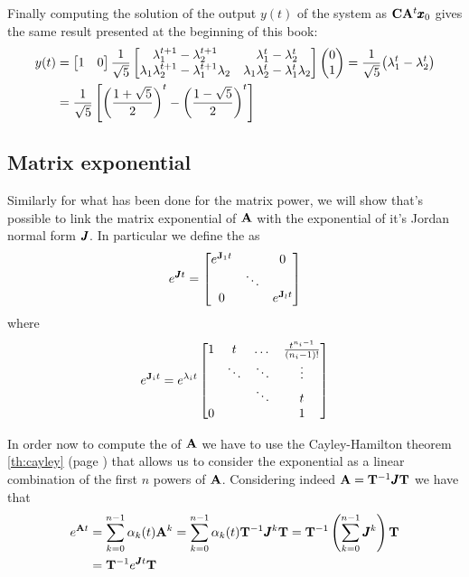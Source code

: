 	Finally computing the solution of the output $y(t)$ of the system as $\mathbf{C} \mathbf{A}^t \pmb{x}_0$ gives the same result presented at the beginning of this book:
	\begin{align*}
		y(t) & = \begin{bmatrix} 1 & 0 \end{bmatrix} \frac 1{\sqrt 5} \begin{bmatrix}  \lambda_1^{t+1} -\lambda_2^{t+1} & \lambda_1^t - \lambda_2^t \\ \lambda_1 \lambda_2^{t+1} - \lambda_1^{t+1} \lambda_2 & \lambda_1\lambda_2^t - \lambda_1^t \lambda_2   \end{bmatrix} \begin{pmatrix} 0 \\ 1 \end{pmatrix} = \frac 1 {\sqrt 5}\big(\lambda_1^t - \lambda_2^t\big) \\ & = \frac 1 {\sqrt 5} \left[ \left(\frac{1+\sqrt 5}{2}\right)^t - \left(\frac{1-\sqrt 5}{2}\right)^t \right]
	\end{align*}
	
\subsection{Matrix exponential}
	Similarly for what has been done for the matrix power, we will show that's possible to link the matrix exponential of $\mathbf{A}$ with the exponential of it's Jordan normal form $\pmb{J}$. In particular we define the  as
	\begin{equation}
		e^{\pmb{J} t} = \begin{bmatrix} e^{\mathbf{J}_1t} & & 0 \\ & \ddots \\ 0 & & e^{\mathbf{J}_l t} \end{bmatrix}
	\end{equation}
 	where
 	\begin{equation}
 		e^{\mathbf{J}_i t} = e^{\lambda_i t} \begin{bmatrix} 1 & t & \dots & \frac{t^{n_i-1}}{(n_i-1)!} \\ & \ddots & \ddots & \vdots \\ & & \ddots & t \\ 0 & & & 1  \end{bmatrix}
 	\end{equation}
	
	In order now to compute the  of $\mathbf{A}$ we have to use the Cayley-Hamilton theorem \ref{th:cayley} (page \pageref{th:cayley}) that allows us to consider the exponential as a linear combination of the first $n$ powers of $\mathbf{A}$. Considering indeed $\mathbf{A} = \mathbf{T}^{-1} \pmb{J} \mathbf{T}$ we have that
	\begin{equation} \begin{split}
		e^{\mathbf{A} t} & = \sum_{k=0}^{n-1} \alpha_k(t) \mathbf{A}^k = \sum_{k=0}^{n-1} \alpha_k(t) \mathbf{T}^{-1} \pmb{J}^k \mathbf{T} = \mathbf{T}^{-1} \left( \sum_{k=0}^{n-1} \pmb{J}^k\right) \mathbf{T} \\ 
		& = \mathbf{T}^{-1} e^{\pmb{J} t} \mathbf{T}
	\end{split} \end{equation}
	
